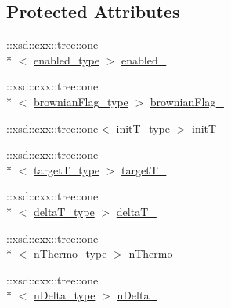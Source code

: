 \subsection*{Protected Attributes}
\begin{DoxyCompactItemize}
\item 
\-::xsd\-::cxx\-::tree\-::one\\*
$<$ \hyperlink{classthermo__t_adf9ac04cf37c2de46153e42511aa24c2}{enabled\-\_\-type} $>$ \hyperlink{classthermo__t_a943300cbe544be4d59d3962eaba464d2}{enabled\-\_\-}
\item 
\-::xsd\-::cxx\-::tree\-::one\\*
$<$ \hyperlink{classthermo__t_a124b0a16394a6c7839596d1a8ba5c35b}{brownian\-Flag\-\_\-type} $>$ \hyperlink{classthermo__t_a4e7aff42cfde2e459eae29dd08cd4335}{brownian\-Flag\-\_\-}
\item 
\-::xsd\-::cxx\-::tree\-::one$<$ \hyperlink{classthermo__t_a29526c32fe31feb33a21833b0040dca7}{init\-T\-\_\-type} $>$ \hyperlink{classthermo__t_a40762511b36c05a5923bad0cb1b49f39}{init\-T\-\_\-}
\item 
\-::xsd\-::cxx\-::tree\-::one\\*
$<$ \hyperlink{classthermo__t_a87b71140ee6bb1936aeed1d3b79a3596}{target\-T\-\_\-type} $>$ \hyperlink{classthermo__t_a1d1b8236fb2ea4426f2a83e04f8382d0}{target\-T\-\_\-}
\item 
\-::xsd\-::cxx\-::tree\-::one\\*
$<$ \hyperlink{classthermo__t_af616f20681b799198b8c97c235092181}{delta\-T\-\_\-type} $>$ \hyperlink{classthermo__t_a76fc3ddc3befeeab5226f255391a054c}{delta\-T\-\_\-}
\item 
\-::xsd\-::cxx\-::tree\-::one\\*
$<$ \hyperlink{classthermo__t_a37e4458c88caf30dc0257b65e5f2af94}{n\-Thermo\-\_\-type} $>$ \hyperlink{classthermo__t_a547f76192ba098eb94349c88427b9839}{n\-Thermo\-\_\-}
\item 
\-::xsd\-::cxx\-::tree\-::one\\*
$<$ \hyperlink{classthermo__t_a814f5379ac544ebfdb16162514d961c1}{n\-Delta\-\_\-type} $>$ \hyperlink{classthermo__t_a57e12294a2b9b189dfb9039c5d6ec8e5}{n\-Delta\-\_\-}
\end{DoxyCompactItemize}


